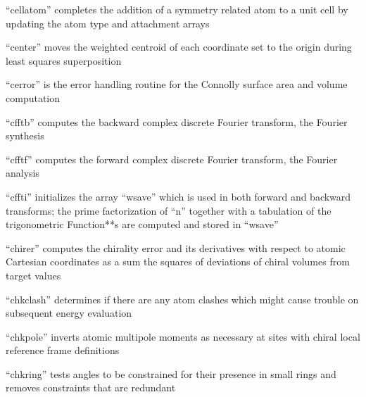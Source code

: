 \documentclass[letterpaper,11pt,english]{sphinxmanual}
\begin{document}

“cellatom” completes the addition of a symmetry related atom to a unit cell by updating the atom type and attachment arrays


“center” moves the weighted centroid of each coordinate set to the origin during least squares superposition


“cerror” is the error handling routine for the Connolly surface area and volume computation


“cfftb” computes the backward complex discrete Fourier transform, the Fourier synthesis



“cfftf” computes the forward complex discrete Fourier transform, the Fourier analysis



“cffti” initializes the array “wsave” which is used in both forward and backward transforms; the prime factorization of “n” together with a tabulation of the trigonometric Function**s are computed and stored in “wsave”



“chirer” computes the chirality error and its derivatives with respect to atomic Cartesian coordinates as a sum the squares of deviations of chiral volumes from target values


“chkclash” determines if there are any atom clashes which might cause trouble on subsequent energy evaluation


“chkpole” inverts atomic multipole moments as necessary at sites with chiral local reference frame definitions


“chkring” tests angles to be constrained for their presence in small rings and removes constraints that are redundant
\end{document}
